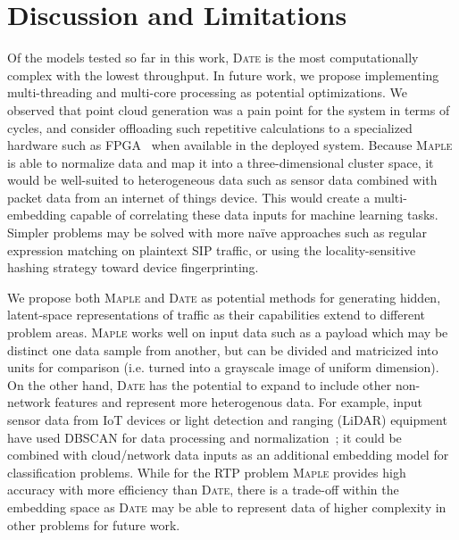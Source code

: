 \section{Discussion and Limitations}

Of the models tested so far in this work, \textsc{Date} is the most computationally complex with the lowest throughput. In future work, we propose implementing multi-threading and multi-core processing as potential optimizations. We observed that point cloud generation was a pain point for the system in terms of cycles, and consider offloading such repetitive calculations to a specialized hardware such as FPGA~\cite{Song2005EfficientPC} when available in the deployed system. Because \textsc{Maple} is able to normalize data and map it into a three-dimensional cluster space, it would be well-suited to heterogeneous data such as sensor data combined with packet data from an internet of things device. This would create a multi-embedding capable of correlating these data inputs for machine learning tasks. Simpler problems may be solved with more naïve approaches such as regular expression matching on plaintext SIP traffic, or using the locality-sensitive hashing strategy toward device fingerprinting.

We propose both \textsc{Maple} and \textsc{Date} as potential methods for generating hidden, latent-space representations of traffic as their capabilities extend to different problem areas. \textsc{Maple} works well on input data such as a payload which may be distinct one data sample from another, but can be divided and matricized into units for comparison (i.e. turned into a grayscale image of uniform dimension). On the other hand, \textsc{Date} has the potential to expand to include other non-network features and represent more heterogenous data. For example, input sensor data from IoT devices or light detection and ranging (LiDAR) equipment have used DBSCAN for data processing and normalization~\cite{wanglidar2019}; it could be combined with cloud/network data inputs as an additional embedding model for classification problems. While for the RTP problem \textsc{Maple} provides high accuracy with more efficiency than \textsc{Date}, there is a trade-off within the embedding space as \textsc{Date} may be able to represent data of higher complexity in other problems for future work.
